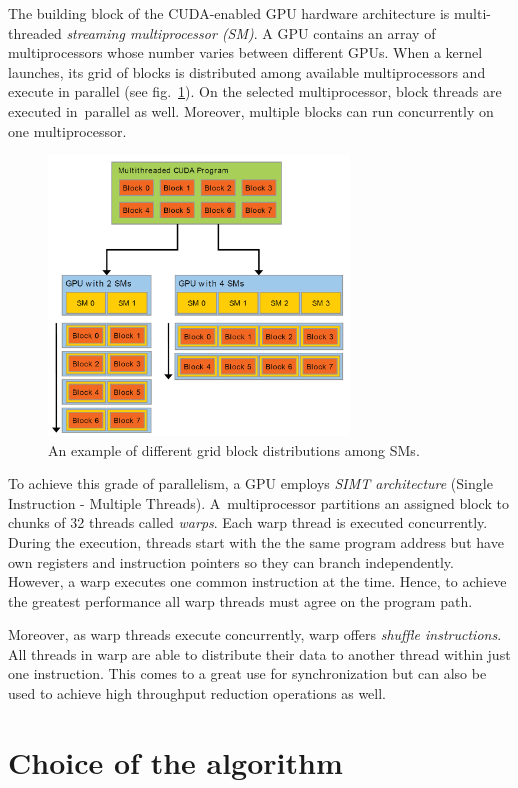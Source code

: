 The building block of the CUDA-enabled GPU hardware architecture is multi-threaded \emph{streaming multiprocessor (SM)}. A GPU contains an array of multiprocessors whose number varies between different GPUs. When a kernel launches, its grid of blocks is distributed among available multiprocessors and execute in parallel (see fig.~\ref{fig02:SM}). On the selected multiprocessor, block threads are executed in~parallel as well. Moreover, multiple blocks can run concurrently on one multiprocessor.

\begin{figure}\centering
	\includegraphics[width=8cm]{img/SM}
	\caption{An example of different grid block distributions among SMs.}
	\label{fig02:SM}
\end{figure}

To achieve this grade of parallelism, a GPU employs \emph{SIMT architecture} (Single Instruction - Multiple Threads). A~multiprocessor partitions an assigned block to chunks of 32 threads called \emph{warps}. Each warp thread is executed concurrently. During the execution, threads start with the the same program address but have own registers and instruction pointers so they can branch independently. However, a warp executes one common instruction at the time. Hence, to achieve the greatest performance all warp threads must agree on the program path.

Moreover, as warp threads execute concurrently, warp offers \emph{shuffle instructions}. All threads in warp are able to distribute their data to another thread within just one instruction. This comes to a great use for synchronization but can also be used to achieve high throughput reduction operations as well.


\section{Choice of the algorithm}

